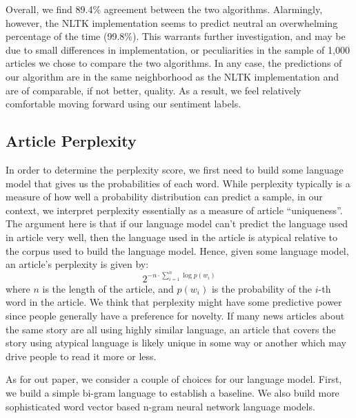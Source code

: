 \documentclass[fleqn,12pt]{SelfArx} %
\begin{document}
\vspace{10 mm}

Overall, we find 89.4\% agreement between the two algorithms. Alarmingly, however, the NLTK implementation seems to predict neutral an overwhelming percentage of the time (99.8\%). This warrants further investigation, and may be due to small differences in implementation, or peculiarities in the sample of 1,000 articles we chose to compare the two algorithms. In any case, the predictions of our algorithm are in the same neighborhood as the NLTK implementation and are of comparable, if not better, quality. As a result, we feel relatively comfortable moving forward using our sentiment labels.

\subsection{Article Perplexity}
In order to determine the perplexity score, we first need to build some language model that gives us the probabilities of each word. While perplexity typically is a measure of how well a probability distribution can predict a sample, in our context, we interpret perplexity essentially as a measure of article “uniqueness”. The argument here is that if our language model can’t predict the language used in article very well, then the language used in the article is atypical relative to the corpus used to build the language model. Hence, given some language model, an article's perplexity is given by:
\begin{equation}
	2^{-n\cdot\sum_{i=1}^n \log p(w_i)}
\end{equation}
where $n$ is the length of the article, and $p(w_i)$ is the probability of the $i$-th word in the article. We think that perplexity might have some predictive power since people generally have a preference for novelty. If many news articles about the same story are all using highly similar language, an article that covers the story using atypical language is likely unique in some way or another which may drive people to read it more or less.

As for out paper, we consider a couple of choices for our language model. First, we build a simple bi-gram language to establish a baseline. We also build more sophisticated word vector based n-gram neural network language models.
\end{document}
